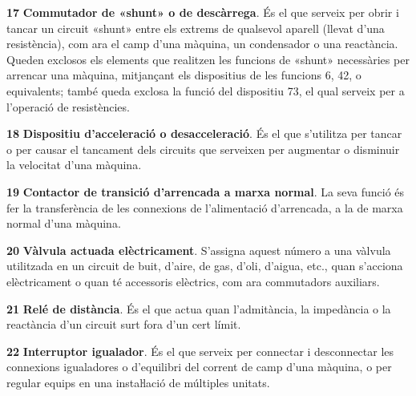 \begin{multicols}{2}
\begin{list}{}
\item[\textbf{17}]   
  
\textbf{Commutador de  «shunt» o de descàrrega}. És el que serveix per obrir i tancar
un circuit «shunt» entre els extrems de qualsevol aparell (llevat d'una resistència), com ara el camp d'una màquina, un condensador o
una reactància. Queden exclosos els elements que realitzen les
funcions de «shunt» necessàries per arrencar una màquina, mitjançant
els dispositius de les funcions 6, 42, o equivalents; també queda exclosa la funció
del dispositiu 73, el qual serveix per a l'operació de resistències.

\item[\textbf{18}]  
 \textbf{Dispositiu d'acceleració o desacceleració}. És
el que s'utilitza per tancar o per causar el tancament dels circuits
que serveixen per augmentar o disminuir la velocitat d'una màquina.

\item[\textbf{19}]  
\textbf{Contactor de transició d'arrencada a marxa normal}. La seva
funció és fer la transferència de les connexions de l'alimentació
d'arrencada, a la de marxa normal d'una màquina.

\item[\textbf{20}]  
 \textbf{Vàlvula actuada elèctricament}. S'assigna aquest número a una vàlvula
utilitzada en un circuit de buit, d'aire, de gas, d'oli, d'aigua,
etc., quan s'acciona elèctricament o quan té accessoris elèctrics,
com ara commutadors auxiliars.

\item[\textbf{21}]   
\textbf{Relé de distància}. És el que actua
quan l'admitància, la impedància o la reactància d'un circuit surt fora d'un cert límit.

\item[\textbf{22}]   
\textbf{Interruptor igualador}.  És el
que serveix per connectar i desconnectar les connexions igualadores
o d'equilibri del corrent de camp d'una màquina, o per regular
equips en una  instaŀlació de  múltiples unitats.


\end{list}
\end{multicols}
